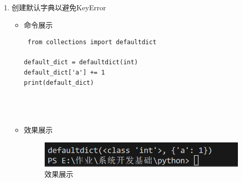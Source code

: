 \documentclass[UTF8]{ctexart}
\begin{document}
\begin{enumerate}
  \item 创建默认字典以避免KeyError
  \begin{itemize}
  \item 命令展示
  \begin{verbatim}
 from collections import defaultdict

default_dict = defaultdict(int)
default_dict['a'] += 1
print(default_dict)


    
  \end{verbatim}

  \item 效果展示
  \begin{figure}[H]
    \centering
    \includegraphics[width=\textwidth]{2115} %
    \caption{效果展示}
  
  \end{figure}
\end{itemize}
\end{enumerate}
\end{document}
